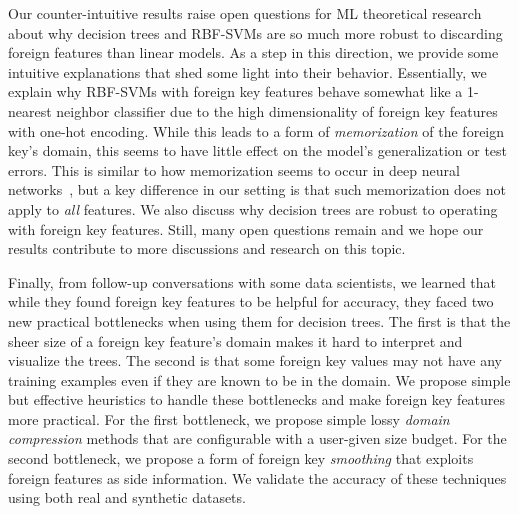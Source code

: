 \documentclass[sigconf]{acmart}
\newcommand{\eat}[1]{}
\begin{document}
Our counter-intuitive results raise open questions for ML theoretical research about why decision trees and RBF-SVMs are so much more robust to discarding foreign features
than linear models. As a step in this direction, we provide some intuitive explanations that shed some light into their behavior. 
Essentially, we explain why RBF-SVMs with foreign key features behave somewhat like a 1-nearest neighbor classifier due to the high dimensionality of foreign key features with 
one-hot encoding. While this leads to a form of \textit{memorization} of the foreign key's domain, this seems to have little effect on the model's generalization or test errors.
This is similar to how memorization seems to occur in deep neural networks~\cite{rechtdnn}, but a key difference in our setting is that such memorization does not apply to
\textit{all} features. We also discuss why decision trees are robust to operating with foreign key features. 
Still, many open questions remain and we hope our results contribute to more discussions and research on this topic.

\eat{
We extend the worst-case simulation scenario for linear models by replicating the foreign feature that determines the target multiple times. The idea is to make a model that uses 
the foreign key feature alone to overfit more than one that uses the foreign features. In particular, for the RBF-SVM, this scenario demonstrates that it behaves 
more similarly to a 1-nearest neighbor classifier when using the foreign key feature but less so when the number of relevant foreign features are increased.
}

Finally, from follow-up conversations with some data scientists, we learned that while they found foreign key features to be helpful for accuracy, they faced two new practical 
bottlenecks when using them for decision trees. The first is that the sheer size of a foreign key feature's domain makes it hard to interpret and visualize the trees. 
The second is that some foreign key values may not have any training examples even if they are known to be in the domain. 
We propose simple but effective heuristics to handle these bottlenecks and make foreign key features more practical. For the first bottleneck, we propose simple lossy 
\textit{domain compression} methods that are configurable with a user-given size budget. For the second bottleneck, we propose a form of foreign key \textit{smoothing} 
that exploits foreign features as side information. We validate the accuracy of these techniques using both real and synthetic datasets.
\end{document}

